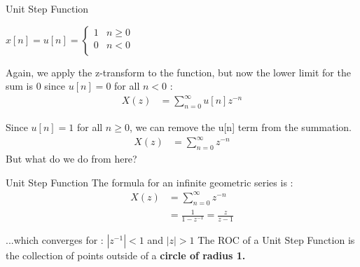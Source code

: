 \documentclass{beamer}
\begin{document}
\begin{frame}{Unit Step Function}
    \begin{center}
        $ x[n] = u[n] =  
        \begin{cases}
            1 & n \geq 0\\
            0 & n < 0\\
        \end{cases} $
    \end{center}
    Again, we apply the z-transform to the function, but now the lower limit for the sum is 0 since $u[n] = 0$ for all  $n < 0$ :
    \begin{align*}
    {X(z)} &= \sum_{n=0}^{\infty} u[n] z^{-n}
    \end{align*}
    
    Since $u[n] = 1$ for all $n \geq 0$, we can remove the u[n] term from the summation.
    \begin{align*}
    {X(z)} &= \sum_{n=0}^{\infty} z^{-n}
    \end{align*}
    But what do we do from here?
\end{frame}
\begin{frame}{Unit Step Function}
    The formula for an infinite geometric series is :
    \begin{align*}
    {X(z)} &= \sum_{n=0}^{\infty} z^{-n} \\
           &= \frac{1}{1-z^{-1}} = \boxed{\frac{z}{z-1}}
    \end{align*}
    
    ...which converges for : $|z^{-1}| < 1$ and $|z| > 1$
    \linebreak \linebreak
    The ROC of a Unit Step Function is the collection of points outside of a \textbf{circle of radius 1.}
    
    
\end{frame}
\end{document}
